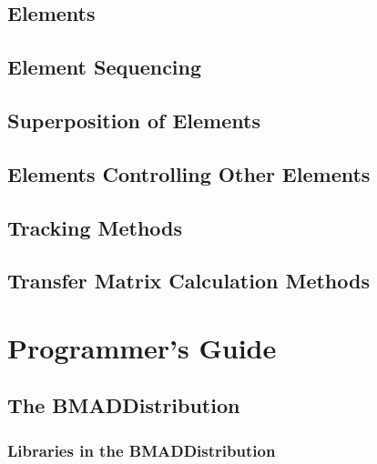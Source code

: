 \documentclass{book}
\newcommand{\bmad}{{\bf BMAD}}
\begin{document}
\chapter{Elements}

\chapter{Element Sequencing}

\chapter{Superposition of Elements}

\chapter{Elements Controlling Other Elements}

\chapter{Tracking Methods}

\chapter{Transfer Matrix Calculation Methods}

\part{Programmer's Guide}

\chapter{The \bmad Distribution}



\section{Libraries in the \bmad Distribution}
\end{document}
